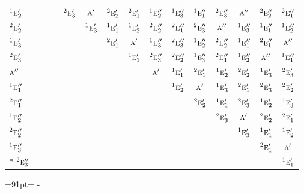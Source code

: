 \documentclass[10pt,a4paper]{article}
\newcommand{\needspace}[1]{\par\penalty-100\begingroup\dimen0=#1\relax\dimen2=\pagegoal
  \advance\dimen2-\pagetotal\ifdim\dimen0>\dimen2\relax\ifdim\dimen2>0pt\vfil\break\fi\fi
  \endgroup}
\numberwithin{equation}{section}
\newcommand{\irr}[1]{\text{\normalfont\scshape #1}}
\newcommand{\conjpair}[1]{{}^{#1}}
\begin{document}
{\begin{longtable}{@{}lcccccccccccccc@{}}
$\conjpair{1}\irr{e}_{2}'$ &  &  &  & $\conjpair{2}\irr{e}_{3}'$ & $\irr{a}'$ & $\conjpair{2}\irr{e}_{2}'$ & $\conjpair{2}\irr{e}_{1}'$ & $\conjpair{1}\irr{e}_{2}''$ & $\conjpair{1}\irr{e}_{3}''$ & $\conjpair{1}\irr{e}_{1}''$ & $\conjpair{2}\irr{e}_{3}''$ & $\irr{a}''$ & $\conjpair{2}\irr{e}_{2}''$ & $\conjpair{2}\irr{e}_{1}''$\\
$\conjpair{2}\irr{e}_{2}'$ &  &  &  &  & $\conjpair{1}\irr{e}_{3}'$ & $\conjpair{1}\irr{e}_{1}'$ & $\conjpair{1}\irr{e}_{2}'$ & $\conjpair{2}\irr{e}_{2}''$ & $\conjpair{2}\irr{e}_{1}''$ & $\conjpair{2}\irr{e}_{3}''$ & $\irr{a}''$ & $\conjpair{1}\irr{e}_{3}''$ & $\conjpair{1}\irr{e}_{1}''$ & $\conjpair{1}\irr{e}_{2}''$\\
$\conjpair{1}\irr{e}_{3}'$ &  &  &  &  &  & $\conjpair{2}\irr{e}_{1}'$ & $\irr{a}'$ & $\conjpair{1}\irr{e}_{3}''$ & $\conjpair{2}\irr{e}_{3}''$ & $\conjpair{1}\irr{e}_{2}''$ & $\conjpair{2}\irr{e}_{2}''$ & $\conjpair{1}\irr{e}_{1}''$ & $\conjpair{2}\irr{e}_{1}''$ & $\irr{a}''$\\
$\conjpair{2}\irr{e}_{3}'$ &  &  &  &  &  &  & $\conjpair{1}\irr{e}_{1}'$ & $\conjpair{2}\irr{e}_{3}''$ & $\conjpair{2}\irr{e}_{2}''$ & $\conjpair{1}\irr{e}_{3}''$ & $\conjpair{2}\irr{e}_{1}''$ & $\conjpair{1}\irr{e}_{2}''$ & $\irr{a}''$ & $\conjpair{1}\irr{e}_{1}''$\\
$\irr{a}''$ &  &  &  &  &  &  &  & $\irr{a}'$ & $\conjpair{1}\irr{e}_{1}'$ & $\conjpair{2}\irr{e}_{1}'$ & $\conjpair{1}\irr{e}_{2}'$ & $\conjpair{2}\irr{e}_{2}'$ & $\conjpair{1}\irr{e}_{3}'$ & $\conjpair{2}\irr{e}_{3}'$\\
$\conjpair{1}\irr{e}_{1}''$ &  &  &  &  &  &  &  &  & $\conjpair{1}\irr{e}_{2}'$ & $\irr{a}'$ & $\conjpair{1}\irr{e}_{3}'$ & $\conjpair{2}\irr{e}_{1}'$ & $\conjpair{2}\irr{e}_{3}'$ & $\conjpair{2}\irr{e}_{2}'$\\
$\conjpair{2}\irr{e}_{1}''$ &  &  &  &  &  &  &  &  &  & $\conjpair{2}\irr{e}_{2}'$ & $\conjpair{1}\irr{e}_{1}'$ & $\conjpair{2}\irr{e}_{3}'$ & $\conjpair{1}\irr{e}_{2}'$ & $\conjpair{1}\irr{e}_{3}'$\\
$\conjpair{1}\irr{e}_{2}''$ &  &  &  &  &  &  &  &  &  &  & $\conjpair{2}\irr{e}_{3}'$ & $\irr{a}'$ & $\conjpair{2}\irr{e}_{2}'$ & $\conjpair{2}\irr{e}_{1}'$\\
$\conjpair{2}\irr{e}_{2}''$ &  &  &  &  &  &  &  &  &  &  &  & $\conjpair{1}\irr{e}_{3}'$ & $\conjpair{1}\irr{e}_{1}'$ & $\conjpair{1}\irr{e}_{2}'$\\
$\conjpair{1}\irr{e}_{3}''$ &  &  &  &  &  &  &  &  &  &  &  &  & $\conjpair{2}\irr{e}_{1}'$ & $\irr{a}'$\\*
$\conjpair{2}\irr{e}_{3}''$ &  &  &  &  &  &  &  &  &  &  &  &  &  & $\conjpair{1}\irr{e}_{1}'$\\
\bottomrule\end{longtable}}
\needspace{91pt}
\end{document}
